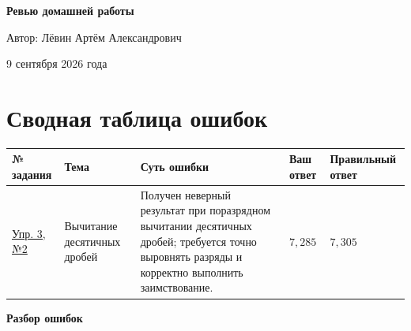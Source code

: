 \documentclass[12pt,a4paper]{article}
\begin{document}
\begin{titlepage}
\centering
\vspace*{0.22\textheight}

{\LARGE\bfseries Ревью домашней работы\par}
\vspace{2.2cm}

{\large Автор: Лёвин Артём Александрович\par}
\vspace{0.8cm}

{\large 9 сентября 2026 года\par}

\vfill
{}
\vspace{0.8cm}
\end{titlepage}

\newpage
\section*{Сводная таблица ошибок}

{\small
\setlength{\tabcolsep}{3pt}
\begin{tabular}{@{}L{2.2cm}L{3.0cm}L{3.9cm}L{2.5cm}L{2.9cm}@{}}
\toprule
\textbf{№ задания} & \textbf{Тема} & \textbf{Суть ошибки} & \textbf{Ваш ответ} & \textbf{Правильный ответ} \\
\midrule
\hyperref[task:3-2]{Упр. 3, №2} &
Вычитание десятичных дробей &
Получен неверный результат при поразрядном вычитании десятичных дробей; требуется точно выровнять разряды и корректно выполнить заимствование. &
$7{,}285$ &
$7{,}305$ \\
\bottomrule
\end{tabular}
}

\newpage
\thispagestyle{empty}
\vspace*{\fill}
\begin{center}
{\LARGE\bfseries Разбор ошибок}
\end{center}
\vspace*{\fill}

\newpage
{}
\label{task:3-2}
\end{document}
